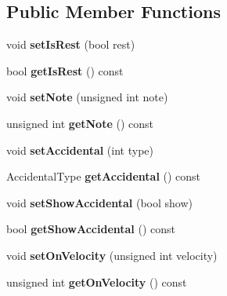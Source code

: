 \subsection*{Public Member Functions}
\begin{DoxyCompactItemize}
\item 
\mbox{\label{class_o_v_e_1_1_note_a23028f5c304d48d3ca0c09152d37b786}} 
void {\bfseries set\+Is\+Rest} (bool rest)
\item 
\mbox{\label{class_o_v_e_1_1_note_a2a76890b886712d77ba8532f7a0f8b10}} 
bool {\bfseries get\+Is\+Rest} () const
\item 
\mbox{\label{class_o_v_e_1_1_note_ad3d956b4ec0221c6e4162e165da0ac69}} 
void {\bfseries set\+Note} (unsigned int note)
\item 
\mbox{\label{class_o_v_e_1_1_note_af80ac4531a12915c77cc4e84decc40db}} 
unsigned int {\bfseries get\+Note} () const
\item 
\mbox{\label{class_o_v_e_1_1_note_aa18d90c037ae2d072c74ab37ef558253}} 
void {\bfseries set\+Accidental} (int type)
\item 
\mbox{\label{class_o_v_e_1_1_note_a4cbac686f880c70bf7c4988bb9662058}} 
Accidental\+Type {\bfseries get\+Accidental} () const
\item 
\mbox{\label{class_o_v_e_1_1_note_ad6ac9a322234073febb7cf598c94f3ca}} 
void {\bfseries set\+Show\+Accidental} (bool show)
\item 
\mbox{\label{class_o_v_e_1_1_note_a8fc2e4791f20d47e870d46806122fdb0}} 
bool {\bfseries get\+Show\+Accidental} () const
\item 
\mbox{\label{class_o_v_e_1_1_note_a47a60374d545dba2ec541d298bb853ee}} 
void {\bfseries set\+On\+Velocity} (unsigned int velocity)
\item 
\mbox{\label{class_o_v_e_1_1_note_a0a840bf5cce4cc90f6f203ada941371d}} 
unsigned int {\bfseries get\+On\+Velocity} () const

\end{DoxyCompactItemize}
